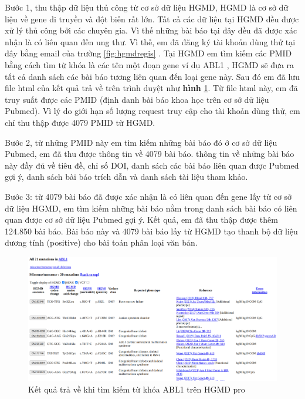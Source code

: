 \documentclass[../DoAn.tex]{subfiles}
\begin{document}
Bước 1, thu thập dữ liệu thủ công từ cơ sở dữ liệu HGMD, HGMD là cơ sở dữ liệu về gene di truyền và đột biến rất lớn. Tất cả các dữ liệu tại HGMD đều được xử lý thủ công bởi các chuyên gia. Vì thế những bài báo tại đây đều đã được xác nhận là có liên quan đến ung thư. Vì thế, em đã đăng ký tài khoản dùng thử tại đây bằng email của trường \ref{fig:hgmdregis} . Tại HGMD em tìm kiếm các PMID bằng cách tìm từ khóa là các tên một đoạn gene ví dụ ABL1 , HGMD sẽ đưa ra tất cả danh sách các bài báo tương liên quan đến loại gene này. Sau đó em đã lưu file html của kết quả trả về trên trình duyệt như \textbf{hình} \ref{fig:HGMDABL1}. Từ file html này, em đã truy suất được các PMID (định danh bài báo khoa học trên cơ sở dữ liệu Pubmed). Vì lý do giới hạn số lượng request truy cập cho tài khoản dùng thử, em chỉ thu thập được 4079 PMID từ HGMD.

Bước 2, từ những PMID này em tìm kiếm những bài báo đó ở cơ sở dữ liệu Pubmed, em đã thu được thông tin về 4079 bài báo. thông tin về những bài báo này đầy đủ về tiêu đề, chỉ số DOI, danh sách các bài báo liên quan được Pubmed gợi ý, danh sách bài báo trích dẫn và danh sách tài liệu tham khảo.

Bước 3: từ 4079 bài báo đã được xác nhận là có liên quan đến gene lấy từ cơ sở dữ liệu HGMD, em tìm kiếm những bài báo nằm trong danh sách bài báo có liên quan được cơ sở dữ liệu Pubmed gợi ý. Kết quả, em đã thu thập được thêm 124.850 bài báo. Bài báo này và 4079 bài báo lấy từ HGMD tạo thanh bộ dữ liệu dương tính (positive) cho bài toán phân loại văn bản.

\begin{figure}
\centering
\includegraphics[width=1.1\linewidth]{Hinh_ve/HGMD_ABL1.png}
\caption{Kết quả trả về khi tìm kiếm từ khóa ABL1 trên HGMD pro}
\label{fig:HGMDABL1}
\end{figure}
\end{document}
